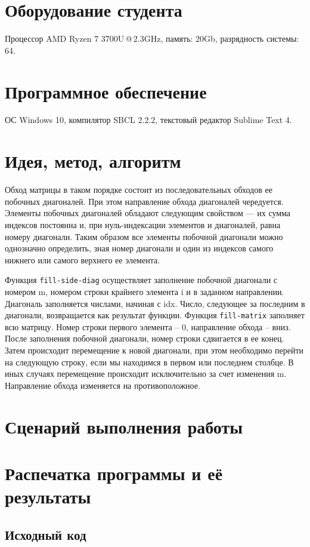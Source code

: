 \documentclass[12pt]{article}
\begin{document}
\section{Оборудование студента}
Процессор AMD Ryzen 7 3700U\,@\,2.3GHz, память: 20Gb, разрядность системы: 64.

\section{Программное обеспечение}
ОС Windows 10, компилятор SBCL 2.2.2, текстовый редактор Sublime Text 4.

\section{Идея, метод, алгоритм}
Обход матрицы в таком порядке состоит из последовательных обходов ее побочных диагоналей. При этом направление обхода диагоналей чередуется. Элементы побочных диагоналей обладают следующим свойством --- их сумма индексов постоянна и, при нуль-индексации элементов и диагоналей, равна номеру диагонали. Таким образом все элементы побочной диагонали можно однозначно определить, зная номер диагонали и один из индексов самого нижнего или самого верхнего ее элемента.

Функция {\tt fill-side-diag} осуществляет заполнение побочной диагонали с номером m, номером строки крайнего элемента i и в заданном направлении. Диагональ заполняется числами, начиная с idx. Число, следующее за последним в диагонали, возвращается как результат функции.
Функция {\tt fill-matrix} заполняет всю матрицу. Номер строки первого элемента -- 0, направление обхода -- вниз. После заполнения побочной диагонали, номер строки сдвигается в ее конец. Затем происходит перемещение к новой диагонали, при этом необходимо перейти на следующую строку, если мы находимся в первом или последнем столбце. В иных случаях перемещение происходит исключительно за счет изменения m. Направление обхода изменяется на противоположное.

\section{Сценарий выполнения работы}

\section{Распечатка программы и её результаты}

\subsection{Исходный код}

\end{document}
